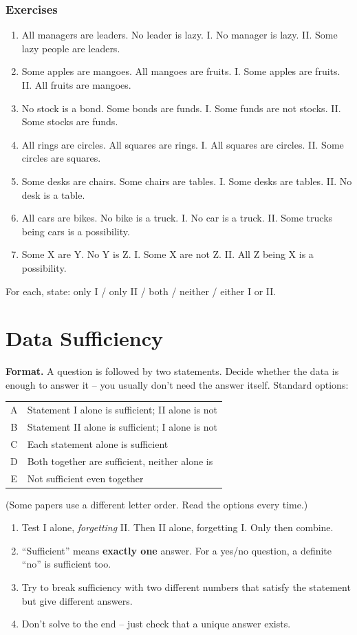 \documentclass[11pt,a4paper,openany]{report}
\newenvironment{exercises}{\subsection*{Exercises \thechapter}\begin{enumerate}[label=\textbf{\thechapter.\arabic*},leftmargin=3.2em]}{\end{enumerate}}
\begin{document}
\begin{exercises}
\item All managers are leaders. No leader is lazy. I. No manager is lazy. II. Some lazy people are leaders.
\item Some apples are mangoes. All mangoes are fruits. I. Some apples are fruits. II. All fruits are mangoes.
\item No stock is a bond. Some bonds are funds. I. Some funds are not stocks. II. Some stocks are funds.
\item All rings are circles. All squares are rings. I. All squares are circles. II. Some circles are squares.
\item Some desks are chairs. Some chairs are tables. I. Some desks are tables. II. No desk is a table.
\item All cars are bikes. No bike is a truck. I. No car is a truck. II. Some trucks being cars is a possibility.
\item Some X are Y. No Y is Z. I. Some X are not Z. II. All Z being X is a possibility.
\end{exercises}
For each, state: only I / only II / both / neither / either I or II.

\chapter{Data Sufficiency}\label{ch:ds}

\textbf{Format.} A question is followed by two statements. Decide whether the data is enough to answer it -- you usually don't need the answer itself. Standard options:
\begin{center}\small
\begin{tabular}{cl}
\toprule
A & Statement I alone is sufficient; II alone is not\\
B & Statement II alone is sufficient; I alone is not\\
C & Each statement alone is sufficient\\
D & Both together are sufficient, neither alone is\\
E & Not sufficient even together\\
\bottomrule
\end{tabular}
\end{center}
(Some papers use a different letter order. Read the options every time.)

\begin{idea}[Discipline]
\begin{enumerate}[nosep]
\item Test I alone, \emph{forgetting} II. Then II alone, forgetting I. Only then combine.
\item ``Sufficient'' means \textbf{exactly one} answer. For a yes/no question, a definite ``no'' is sufficient too.
\item Try to break sufficiency with two different numbers that satisfy the statement but give different answers.
\item Don't solve to the end -- just check that a unique answer exists.
\end{enumerate}
\end{idea}
\end{document}
